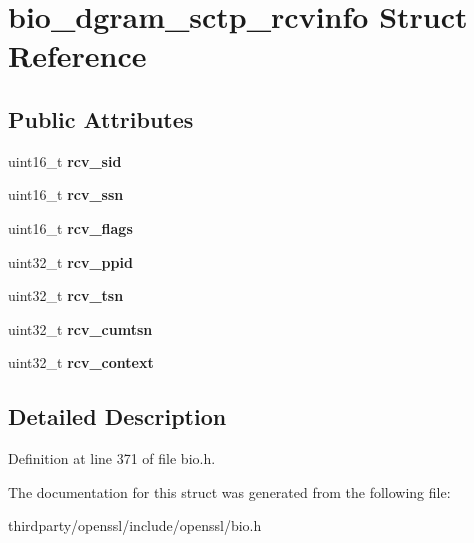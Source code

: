 \hypertarget{structbio__dgram__sctp__rcvinfo}{}\section{bio\+\_\+dgram\+\_\+sctp\+\_\+rcvinfo Struct Reference}
\label{structbio__dgram__sctp__rcvinfo}
\subsection*{Public Attributes}
\begin{DoxyCompactItemize}
\item 
\mbox{\label{structbio__dgram__sctp__rcvinfo_aaddad1a5b0f7b5fda8a0aeb8e5a6c63d}} 
uint16\+\_\+t {\bfseries rcv\+\_\+sid}
\item 
\mbox{\label{structbio__dgram__sctp__rcvinfo_a9cac7bdaa73e1d948a9485a5edd265ca}} 
uint16\+\_\+t {\bfseries rcv\+\_\+ssn}
\item 
\mbox{\label{structbio__dgram__sctp__rcvinfo_abfd14b07964648d311e581a5666d19b6}} 
uint16\+\_\+t {\bfseries rcv\+\_\+flags}
\item 
\mbox{\label{structbio__dgram__sctp__rcvinfo_a3ee7d864acf357f8165e8b988d6d8f54}} 
uint32\+\_\+t {\bfseries rcv\+\_\+ppid}
\item 
\mbox{\label{structbio__dgram__sctp__rcvinfo_adee218bef23543691b93d3e665a7e158}} 
uint32\+\_\+t {\bfseries rcv\+\_\+tsn}
\item 
\mbox{\label{structbio__dgram__sctp__rcvinfo_a6bfc2bacc606356cfdf1c00c71b2227e}} 
uint32\+\_\+t {\bfseries rcv\+\_\+cumtsn}
\item 
\mbox{\label{structbio__dgram__sctp__rcvinfo_aed041b41dfccd0bbb626d34cf03b36cb}} 
uint32\+\_\+t {\bfseries rcv\+\_\+context}
\end{DoxyCompactItemize}


\subsection{Detailed Description}


Definition at line 371 of file bio.\+h.



The documentation for this struct was generated from the following file\+:\begin{DoxyCompactItemize}
\item 
thirdparty/openssl/include/openssl/bio.\+h\end{DoxyCompactItemize}
